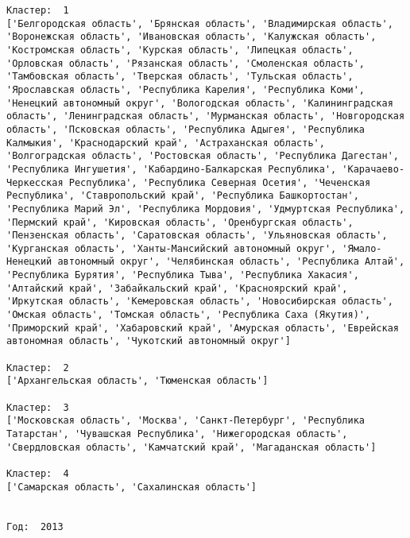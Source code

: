 \documentclass[11pt]{article}
\begin{document}
\begin{Verbatim}[commandchars=\\\{\}]
Кластер:  1
['Белгородская область', 'Брянская область', 'Владимирская область', 'Воронежская область', 'Ивановская область', 'Калужская область', 'Костромская область', 'Курская область', 'Липецкая область', 'Орловская область', 'Рязанская область', 'Смоленская область', 'Тамбовская область', 'Тверская область', 'Тульская область', 'Ярославская область', 'Республика Карелия', 'Республика Коми', 'Ненецкий автономный округ', 'Вологодская область', 'Калинингpадская область', 'Ленинградская область', 'Мурманская область', 'Новгородская область', 'Псковская область', 'Республика Адыгея', 'Республика Калмыкия', 'Краснодарский край', 'Астраханская область', 'Волгоградская область', 'Ростовская область', 'Республика Дагестан', 'Республика Ингушетия', 'Кабардино-Балкарская Республика', 'Карачаево-Черкесская Республика', 'Республика Северная Осетия', 'Чеченская Республика', 'Ставропольский край', 'Республика Башкортостан', 'Республика Марий Эл', 'Республика Мордовия', 'Удмуртская Республика', 'Пермский край', 'Кировская область', 'Оренбургская область', 'Пензенская область', 'Саратовская область', 'Ульяновская область', 'Курганская область', 'Ханты-Мансийский автономный округ', 'Ямало-Ненецкий автономный округ', 'Челябинская область', 'Республика Алтай', 'Республика Бурятия', 'Республика Тыва', 'Республика Хакасия', 'Алтайский край', 'Забайкальский край', 'Красноярский край', 'Иркутская область', 'Кемеровская область', 'Новосибирская область', 'Омская область', 'Томская область', 'Республика Саха (Якутия)', 'Приморский край', 'Хабаровский край', 'Амурская область', 'Еврейская автономная область', 'Чукотский автономный округ']

Кластер:  2
['Архангельская область', 'Тюменская область']

Кластер:  3
['Московская область', 'Москва', 'Санкт-Петербург', 'Республика Татарстан', 'Чувашская Республика', 'Нижегородская область', 'Свердловская область', 'Камчатский край', 'Магаданская область']

Кластер:  4
['Самарская область', 'Сахалинская область']


Год:  2013


\end{Verbatim}
\end{document}
